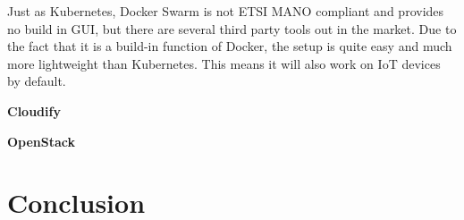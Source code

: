 Just as Kubernetes, Docker Swarm is not \ac{ETSI} \ac{MANO} compliant and provides no build in \ac{GUI}, but there are several third party tools out in the market.
Due to the fact that it is a build-in function of Docker, the setup is quite easy and much more lightweight than Kubernetes.
This means it will also work on \ac{IoT} devices by default.

\textbf{Cloudify}


\textbf{OpenStack}

\section{Conclusion}
\doit
